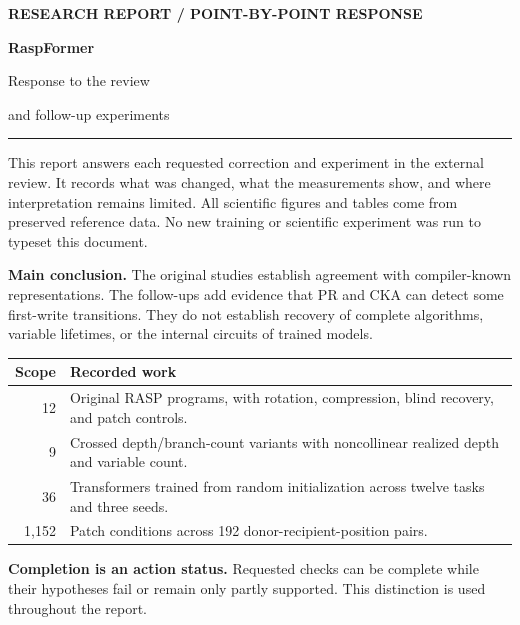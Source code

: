 \documentclass[10pt,a4paper]{article}
\begin{document}
\thispagestyle{empty}
\vspace*{14mm}
{\sffamily\small\bfseries\color{teal}RESEARCH REPORT / POINT-BY-POINT RESPONSE}\par
\vspace{10mm}
{\sffamily\fontsize{36}{40}\selectfont\bfseries\color{navy}RaspFormer}\par
\vspace{4mm}
{\sffamily\fontsize{23}{28}\selectfont\color{navy}Response to the review\par and follow-up experiments}\par
\vspace{8mm}
{\color{teal}\rule{\linewidth}{1.5pt}}
\vspace{6mm}

This report answers each requested correction and experiment in the external review. It records what was changed, what the measurements show, and where interpretation remains limited. All scientific figures and tables come from preserved reference data. No new training or scientific experiment was run to typeset this document.

\textbf{Main conclusion.} The original studies establish agreement with compiler-known representations. The follow-ups add evidence that PR and CKA can detect some first-write transitions. They do not establish recovery of complete algorithms, variable lifetimes, or the internal circuits of trained models.

\begin{center}
\small
\begin{tabularx}{\linewidth}{@{}rX@{}}
\toprule
\textbf{Scope} & \textbf{Recorded work}\\
\midrule
12 & Original RASP programs, with rotation, compression, blind recovery, and patch controls.\\
9 & Crossed depth/branch-count variants with noncollinear realized depth and variable count.\\
36 & Transformers trained from random initialization across twelve tasks and three seeds.\\
1,152 & Patch conditions across 192 donor-recipient-position pairs.\\
\bottomrule
\end{tabularx}
\end{center}

\textbf{Completion is an action status.} Requested checks can be complete while their hypotheses fail or remain only partly supported. This distinction is used throughout the report.
\end{document}
